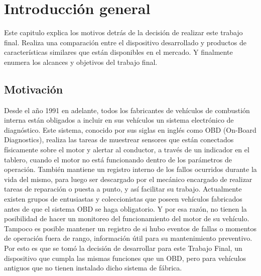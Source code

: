 \chapter{Introducción general} %

Este capitulo explica los motivos detrás de la decisión de realizar este trabajo final. Realiza una comparación entre el dispositivo desarrollado y productos de características similares que están disponibles en el mercado. Y finalmente enumera los alcances y objetivos del trabajo final.

\label{Chapter1} %
\label{IntroGeneral}


\newcommand{\keyword}[1]{\textbf{#1}}
\newcommand{\tabhead}[1]{\textbf{#1}}
\newcommand{\code}[1]{\texttt{#1}}
\newcommand{\file}[1]{\texttt{\bfseries#1}}
\newcommand{\option}[1]{\texttt{\itshape#1}}
\newcommand{\grados}{$^{\circ}$}



\section{Motivación}

Desde el año 1991 en adelante, todos los fabricantes de vehículos de combustión interna están obligados a incluir en sus vehículos un sistema electrónico de diagnóstico. Este sistema, conocido por sus siglas en inglés como OBD (On-Board Diagnostics), realiza las tareas de muestrear sensores que están conectados físicamente sobre el motor y alertar al conductor, a través de un indicador en el tablero, cuando el motor no está funcionando dentro de los parámetros de operación. También mantiene un registro interno de los fallos ocurridos durante la vida del mismo, para luego ser descargado por el mecánico encargado de realizar tareas de reparación o puesta a punto, y así facilitar su trabajo.
Actualmente existen grupos de entusiastas y coleccionistas que poseen vehículos fabricados antes de que el sistema OBD se haga obligatorio. Y por esa razón, no tienen la posibilidad de hacer un monitoreo del funcionamiento del motor de su vehículo. Tampoco es posible mantener un registro de si hubo eventos de fallas o momentos de operación fuera de rango, información útil para su mantenimiento preventivo.
Por esto es que se tomó la decisión de desarrollar para este Trabajo Final, un dispositivo que cumpla las mismas funciones que un OBD, pero para vehículos antiguos que no tienen instalado dicho sistema de fábrica.

